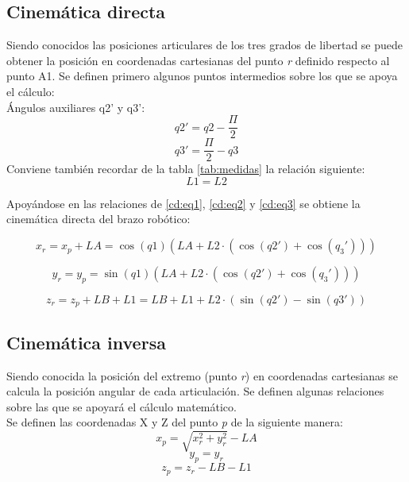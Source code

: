 \subsection{Cinemática directa}
	Siendo conocidos las posiciones articulares de los tres grados de libertad se puede obtener la posición en coordenadas cartesianas del punto \textit{r} definido respecto al punto A1. Se definen primero algunos puntos intermedios sobre los que se apoya el cálculo:
	\\
	
	Ángulos auxiliares q2' y q3':
	 \begin{equation}
	 \label{cd:eq1}
	 q2' = q2 - \frac{\varPi}{2}
	 \end{equation}
	 \begin{equation}
	 \label{cd:eq2}
	 q3' = \frac{\varPi}{2} - q3 
	 \end{equation}
	 Conviene también recordar de la tabla \ref{tab:medidas} la relación siguiente:
	 \begin{equation}
	 \label{cd:eq3}
	 L1 = L2
	 \end{equation}
	
	Apoyándose en las relaciones de \ref{cd:eq1}, \ref{cd:eq2} y \ref{cd:eq3} se obtiene la cinemática directa del brazo robótico:
	    
    \begin{equation}
    x_r = x_p+LA = \cos(q1)\left(LA + L2 \cdot \left(\cos(q2') + \cos(q_3')\right)\right)
    \end{equation}
    
    \begin{equation}
    y_r = y_p = \sin(q1)\left(LA + L2 \cdot \left(\cos(q2') + \cos(q_3')\right)\right)
    \end{equation}
    
    \begin{equation}
    z_r = z_p+LB+L1 = LB + L1 + L2\cdot\left( \sin(q2') - \sin(q3') \right)
    \end{equation}
\subsection{Cinemática inversa}

	Siendo conocida la posición del extremo (punto \textit{r}) en coordenadas cartesianas se calcula la posición angular de cada articulación. Se definen algunas relaciones sobre las que se apoyará el cálculo matemático.
	\\
	
	Se definen las coordenadas X y Z del punto \textit{p} de la siguiente manera: 
	\begin{equation}
	\label{ci:eq0}
	x_p = \sqrt{x_r^2+y_r^2} - LA
	\end{equation}
	\begin{equation}
	\label{ci:eq1}
	y_p = y_r
	\end{equation}
	\begin{equation}
	\label{ci:eq2}
	z_p = z_r - LB - L1
	\end{equation}
	
